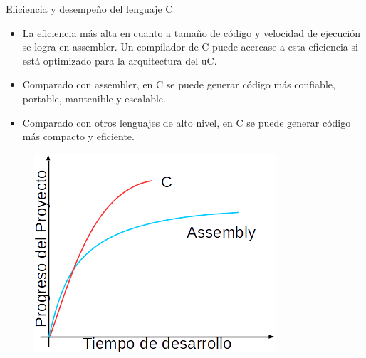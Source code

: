 \documentclass[aspectratio=169]{beamer}
\begin{document}
\begin{frame}{Eficiencia y desempeño del lenguaje C}
  
\begin{minipage}[c]{1.0\linewidth}

	\begin{minipage}[c]{0.5\textwidth}
    \begin{itemize}
      \item La eficiencia más alta en cuanto a tamaño de código y velocidad de ejecución se logra en assembler.  Un compilador de C puede acercase a esta eficiencia si está optimizado para la arquitectura del uC.
      \vspace{10px}
      \item Comparado con assembler, en C se puede generar código más confiable, portable, mantenible y escalable.
      \vspace{10px}
      \item Comparado con otros lenguajes de alto nivel, en C se puede generar código más compacto y eficiente.
    \end{itemize}	
  \end{minipage}
	\hspace{.1\linewidth}
	\begin{minipage}[c]{0.4\linewidth}
		\begin{figure}[H]
			{\includegraphics[width=\textwidth]{./imagenes/CvsAssembly.png}}
		\end{figure}	  	  	
	\end{minipage}
\end{minipage}

\end{frame}  
  
\end{document}
